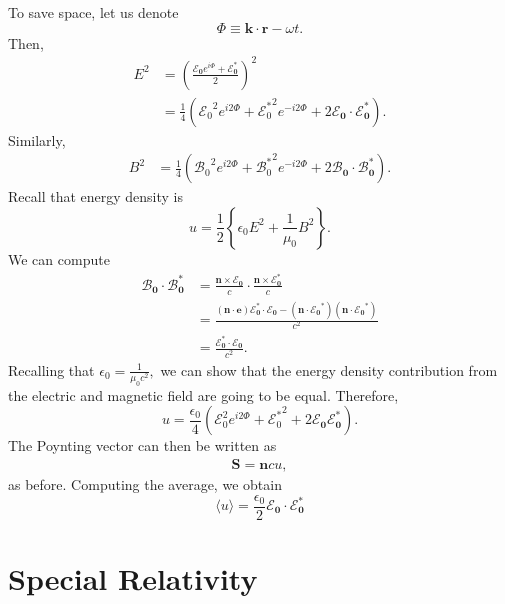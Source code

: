 \documentclass{article}
\numberwithin{equation}{section}
\begin{document}
To save space, let us denote
\begin{equation}
    \Phi \equiv \bm{k}\cdot \bm{r} - \omega t.
\end{equation}
Then,
\begin{align}
    E^2 &= \left(\frac{\bm{\mathcal{E}_0} e^{i\Phi} + \bm{\mathcal{E}^*_0}}{2}\right)^2 \\ 
    &= \frac{1}{4}\left({\mathcal{E}_0}^2 e^{i2\Phi} + {\mathcal{E}^*_0}^2 e^{-i2\Phi} +2\bm{\mathcal{E}_0}\cdot \bm{\mathcal{E}^*_0}\right).
\end{align}
Similarly,
\begin{align}
    B^2 &= \frac{1}{4}\left({\mathcal{B}_0}^2 e^{i2\Phi} + {\mathcal{B}^*_0}^2 e^{-i2\Phi} +2\bm{\mathcal{B}_0}\cdot \bm{\mathcal{B}^*_0}\right).
\end{align}
Recall that energy density is 
\begin{equation}
    u = \frac{1}{2}\left\{\epsilon_0 E^2 + \frac{1}{\mu_0}B^2\right\}.
\end{equation}
We can compute 
\begin{align}
    \bm{\mathcal{B}_0}\cdot \bm{\mathcal{B}^*_0} &= \frac{\bm{n}\times \bm{\mathcal{E}_0}}{c} \cdot \frac{\bm{n}\times \bm{\mathcal{E}^*_0}}{c} \\ 
    &= \frac{(\bm{n}\cdot \bm{e})\bm{\mathcal{E}^*_0}\cdot\bm{\mathcal{E}_0} - (\bm{n}\cdot \bm{\mathcal{E}_0}^*)(\bm{n}\cdot \bm{\mathcal{E}_0}^*)}{c^2} \\ 
    &= \frac{\bm{\mathcal{E}^*_0}\cdot\bm{\mathcal{E}_0}}{c^2}.
\end{align}
Recalling that $\epsilon_0 = \frac{1}{\mu_0 c^2},$ we can show that the energy density contribution from the electric and magnetic field are going to be equal. Therefore,
\begin{equation}
    u = \frac{\epsilon_0}{4}\left(\mathcal{E}_0^2 e^{i2\Phi}  + {\mathcal{E}^*_0}^2 + 2 \bm{\mathcal{E}_0}\bm{\mathcal{E}^*_0}\right).
\end{equation}
The Poynting vector can then be written as 
\begin{align}
    \bm{S} = \bm{n}cu,
\end{align}
as before. Computing the average, we obtain 
\begin{equation}
    \langle u \rangle = \frac{\epsilon_0}{2} \bm{\mathcal{E}_0}\cdot \bm{\mathcal{E}_0^*}
\end{equation}
\section{Special Relativity}
\end{document}
